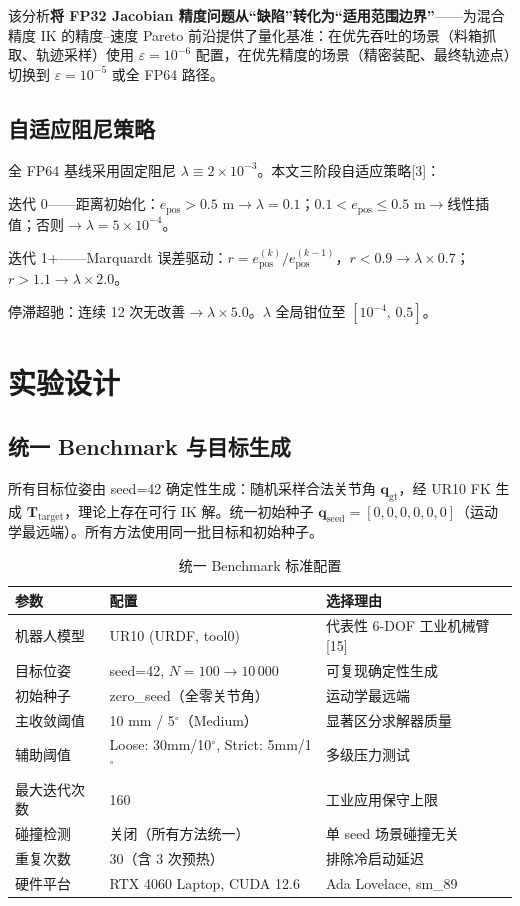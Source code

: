 \documentclass[twocolumn,a4paper,10pt]{ctexart}
\begin{document}
该分析{\bfseries 将 FP32 Jacobian 精度问题从``缺陷''转化为``适用范围边界''}——为混合精度 IK 的精度--速度 Pareto 前沿提供了量化基准：在优先吞吐的场景（料箱抓取、轨迹采样）使用 $\varepsilon=10^{-6}$ 配置，在优先精度的场景（精密装配、最终轨迹点）切换到 $\varepsilon=10^{-5}$ 或全 FP64 路径。

\subsection{自适应阻尼策略}

全 FP64 基线采用固定阻尼 $\lambda\equiv2\times10^{-3}$。本文三阶段自适应策略[3]：

迭代 0——距离初始化：$e_{\mathrm{pos}}>0.5$ m$\to\lambda=0.1$；$0.1<e_{\mathrm{pos}}\le0.5$ m$\to$线性插值；否则$\to\lambda=5\times10^{-4}$。

迭代 1+——Marquardt 误差驱动：$r=e^{(k)}_{\mathrm{pos}}/e^{(k-1)}_{\mathrm{pos}}$，$r<0.9\to\lambda\times0.7$；$r>1.1\to\lambda\times2.0$。

停滞超驰：连续 12 次无改善$\to\lambda\times5.0$。$\lambda$ 全局钳位至 $[10^{-4},\,0.5]$。

\section{实验设计}\label{sec:exp}

\subsection{统一 Benchmark 与目标生成}

所有目标位姿由 seed=42 确定性生成：随机采样合法关节角 $\mathbf{q}_{\mathrm{gt}}$，经 UR10 FK 生成 $\mathbf{T}_{\mathrm{target}}$，理论上存在可行 IK 解。统一初始种子 $\mathbf{q}_{\mathrm{seed}}=[0,0,0,0,0,0]$（运动学最远端）。所有方法使用同一批目标和初始种子。

\begin{table}[ht]
\centering\small
\caption{统一 Benchmark 标准配置}
\label{tab:benchmark}
\begin{tabular}{lll}
\toprule
参数 & 配置 & 选择理由 \\
\midrule
机器人模型 & UR10 (URDF, tool0) & 代表性 6-DOF 工业机械臂[15] \\
目标位姿 & seed=42, $N=100\to10\,000$ & 可复现确定性生成 \\
初始种子 & zero\_seed（全零关节角） & 运动学最远端 \\
主收敛阈值 & 10 mm / 5$^\circ$（Medium） & 显著区分求解器质量 \\
辅助阈值 & Loose: 30mm/10$^\circ$, Strict: 5mm/1$^\circ$ & 多级压力测试 \\
最大迭代次数 & 160 & 工业应用保守上限 \\
碰撞检测 & 关闭（所有方法统一） & 单 seed 场景碰撞无关 \\
重复次数 & 30（含 3 次预热） & 排除冷启动延迟 \\
硬件平台 & RTX 4060 Laptop, CUDA 12.6 & Ada Lovelace, sm\_89 \\
\bottomrule
\end{tabular}
\end{table}
\end{document}
